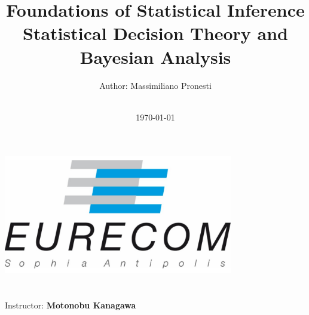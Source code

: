 \title{\Large Foundations of Statistical Inference  \\[0.5cm]
	\bf\Large Statistical Decision
	Theory and
	Bayesian Analysis }
\author{\large Author: Massimiliano Pronesti\\ \ \\}
\date{\large \today}

\makeatletter
\begin{titlepage}
	\begin{center}
		{ \includegraphics[width=10cm]{../eurecom.png}}
		{\ \\ \ \\}
		\vbox{}\vspace{5cm}
		{\@title }\\[3cm] 
		{\@author}
		{\large Instructor: \bf Motonobu Kanagawa\\ \ \\}
		{\@date\\}
		
	\end{center}
\end{titlepage}
\makeatother